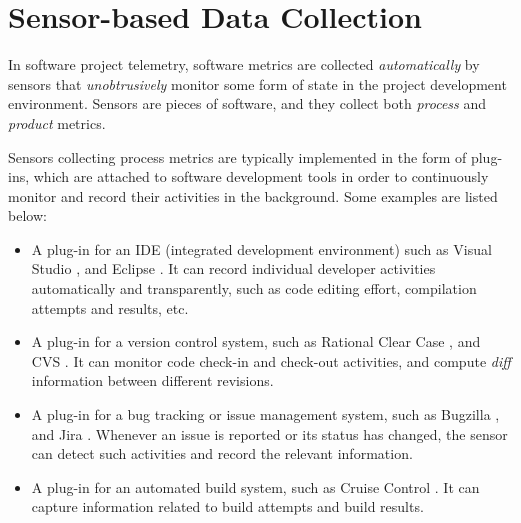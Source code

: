 \section{Sensor-based Data Collection}
\label{Telemetry:Data}



In software project telemetry, software metrics are collected \textit{automatically} by sensors that \textit{unobtrusively} monitor some form of state in the project development environment. Sensors are pieces of software, and they collect both \textit{process} and \textit{product} metrics.

Sensors collecting process metrics are typically implemented in the form of plug-ins, which are attached to software development tools in order to continuously monitor and record their activities in the background. Some examples are listed below:

\begin{itemize}

	\item A plug-in for an IDE (integrated development environment) such as Visual Studio \cite{Software:VisualStudio}, and Eclipse \cite{Software:Eclipse}. It can record individual developer activities automatically and transparently, such as code editing effort, compilation attempts and results, etc.

  \item A plug-in for a version control system, such as Rational Clear Case \cite{Software:ClearCase}, and CVS \cite{Software:CVS}. It can monitor code check-in and check-out activities, and compute \textit{diff} information between different revisions.
  
  \item A plug-in for a bug tracking or issue management system, such as Bugzilla \cite{Software:Bugzilla}, and Jira \cite{Software:Jira}. Whenever an issue is reported or its status has changed, the sensor can detect such activities and record the relevant information.
  
  \item A plug-in for an automated build system, such as Cruise Control \cite{Software:CruiseControl}. It can capture information related to build attempts and build results.

\end{itemize}



